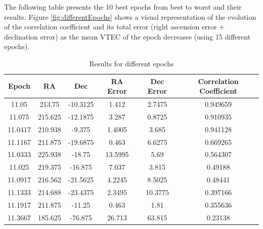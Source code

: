 The following table presents the 10 best epochs from best to worst and their results. Figure \ref{fig:differentEpochs} shows a visual representation of the evolution of the correlation coefficient and its total error (right ascension error + declination error) as the mean VTEC of the epoch decreases (using 15 different epochs).

\begin{table}[h!]
	\centering
	\def\arraystretch{1.2}
	\begin{tabular}{|c c c c c c|} 
		\hline
		\textbf{Epoch} & RA & Dec & RA Error & Dec Error & Correlation Coefficient \\ [0.5ex] 
		\hline\hline
		11.05 & 213.75 & -10.3125 & 1.412 & 2.7475 & 0.949659 \\ 
		\hline
		11.075 & 215.625 & -12.1875 & 3.287 & 0.8725 & 0.910935 \\ 
		\hline
		11.0417 & 210.938 & -9.375 & 1.4005 & 3.685 & 0.941128 \\ 
		\hline
		11.1167 & 211.875 & -19.6875 & 0.463 & 6.6275 & 0.669265 \\ 
		\hline
		11.0333 & 225.938 & -18.75 & 13.5995 & 5.69 & 0.564307 \\ 
		\hline
		11.025 & 219.375 & -16.875 & 7.037 & 3.815 & 0.49188 \\ 
		\hline
		11.0917 & 216.562 & -21.5625 & 4.2245 & 8.5025 & 0.48441 \\ 
		\hline
		11.1333 & 214.688 & -23.4375 & 2.3495 & 10.3775 & 0.397166 \\ 
		\hline
		11.1917 & 211.875 & -11.25 & 0.463 & 1.81 & 0.355636 \\ 
		\hline
		11.3667 & 185.625 & -76.875 & 26.713 & 63.815 & 0.23138 \\ 
		\hline
	\end{tabular}
	\caption{Results for different epochs}
\end{table}

\clearpage

